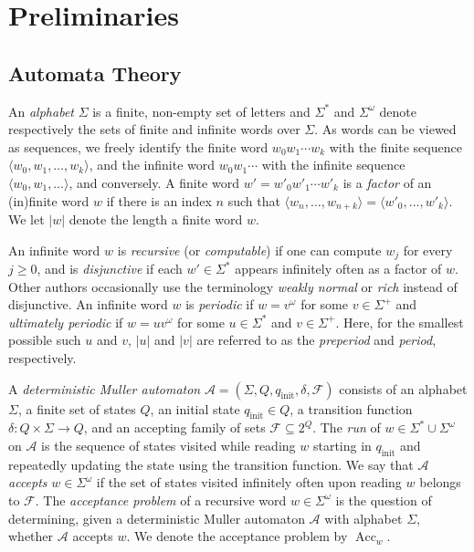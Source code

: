 \documentclass[a4paper,UKenglish,cleveref, autoref, thm-restate]{lipics-v2021}
\newcommand{\nat} {\mathbb{N}}
\newcommand{\Acc} {\operatorname{Acc}}
\begin{document}
\section{Preliminaries}
\subsection{Automata Theory}
An \emph{alphabet} $\Sigma$ is a finite, non-empty set of letters and
$\Sigma^*$ and $\Sigma^\omega$ denote respectively
the sets of finite and infinite words over $\Sigma$. 
As words can be viewed as sequences, we freely identify the finite
word $w_0w_1 \cdots w_k$ with the finite sequence $\langle
w_0,w_1,\dots,w_k\rangle$, and the infinite word $w_0w_1 \cdots $ with
the infinite sequence $\langle w_0,w_1,\dots \rangle$, and conversely.
A finite word $w' = w'_0w'_1 \cdots w'_k$ is a \emph{factor} of an
(in)finite word $w$ if there is an index $n$ such that $\langle
w_n,\dots,w_{n+k} \rangle = \langle w'_0, \dots, w'_k \rangle$.
We let $|w|$ denote the length a finite word $w$. 

An infinite word $w$ is \emph{recursive} (or \emph{computable})
if one can compute $w_j$ for every $j \ge 0$, and
is \emph{disjunctive} if each $w' \in {\Sigma}^*$ appears infinitely often as a factor of $w$.
Other authors occasionally use the terminology \emph{weakly normal} or \emph{rich} instead of disjunctive.
An infinite word $w$ is \emph{periodic} if $w = v^\omega$ for some $v \in \Sigma^+$ and \emph{ultimately periodic} if $w = u v^\omega$ for some $u \in \Sigma^*$ and $v \in \Sigma^+$. 
Here, for the smallest possible such $u$ and $v$, $|u|$ and $|v|$ are
referred to as the \emph{preperiod} and \emph{period}, respectively.

A \emph{deterministic Muller automaton}
$\mathcal{A} = (\Sigma, Q, q_\text{init}, \delta, \mathcal{F})$
consists of an alphabet $\Sigma$, a finite set of states $Q$, an
initial state $q_\text{init} \in Q$, a transition function
$\delta \colon Q \times \Sigma \to Q$, and an accepting family of sets
$\mathcal{F} \subseteq 2^Q$.  The \emph{run} of
$w\in \Sigma^* \cup \Sigma^\omega$ on $\mathcal{A}$ is the sequence of
states visited while reading $w$ starting in $q_\text{init}$ and
repeatedly updating the state using the transition function.  We say
that $\mathcal{A}$ \emph{accepts} $w \in \Sigma^\omega$ if the set of
states visited infinitely often upon reading $w$ belongs to
$\mathcal{F}$.  The \emph{acceptance problem} of a recursive word
$w \in \Sigma^\omega$ is the question of determining, given a
deterministic Muller automaton $\mathcal{A}$ with alphabet $\Sigma$,
whether $\mathcal{A}$ accepts $w$.  We denote the acceptance
problem by $\Acc_w$.
\end{document}
